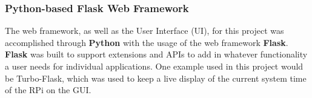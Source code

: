\documentclass[11pt]{article}
\begin{document}
\subsubsection{Python-based Flask Web Framework}
\label{FlaskDesign}

The web framework, as well as the User Interface (UI), for this project was accomplished through \textbf{Python} with the usage of the web framework \textbf{Flask}. \textbf{Flask} was built to support extensions and APIs to add in whatever functionality a user needs for individual applications.  One example used in this project would be Turbo-Flask, which was used to keep a live display of the current system time of the RPi on the GUI.





\end{document}
